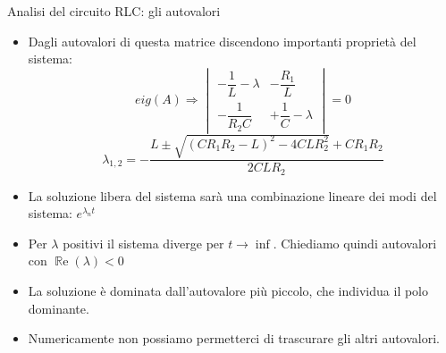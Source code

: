 \documentclass[aspectratio=169, 10pt, handout,usenames,dvipsnames]{beamer}
\begin{document}
\begin{frame}{Analisi del circuito RLC: gli autovalori}
    \begin{itemize}
        \item Dagli autovalori di questa matrice discendono importanti proprietà del sistema:
        \medskip
        \[
        eig(A) \Rightarrow  \begin{vmatrix} -\dfrac{1}{L}-\lambda & - \dfrac{R_1}{L}\\[1.5ex] -\dfrac{1}{R_2 C} & + \dfrac{1}{C}-\lambda \end{vmatrix} = 0
        \]
        \medskip
        \[
        \lambda_{1,2}  = -\frac{L \pm \sqrt{(C R_1 R_2 - L)^2 - 4CL R_2 ^2} + C R_1 R_2} {2 C L R_2}
        \]
        \medskip
        \item La soluzione libera del sistema sarà una combinazione lineare dei \alert{modi} del sistema: \( e^{\lambda_nt}\)
        \item Per $\lambda$ positivi il sistema diverge per $t \rightarrow \inf $. Chiediamo quindi autovalori con $\operatorname{\mathbb{R}e}(\lambda)<0$
        \item La soluzione è dominata dall'autovalore \alert{più piccolo}, che individua il polo dominante. 
        \item Numericamente non possiamo permetterci di trascurare gli altri autovalori.
        
        
 \end{itemize}
\end{frame}
\end{document}
